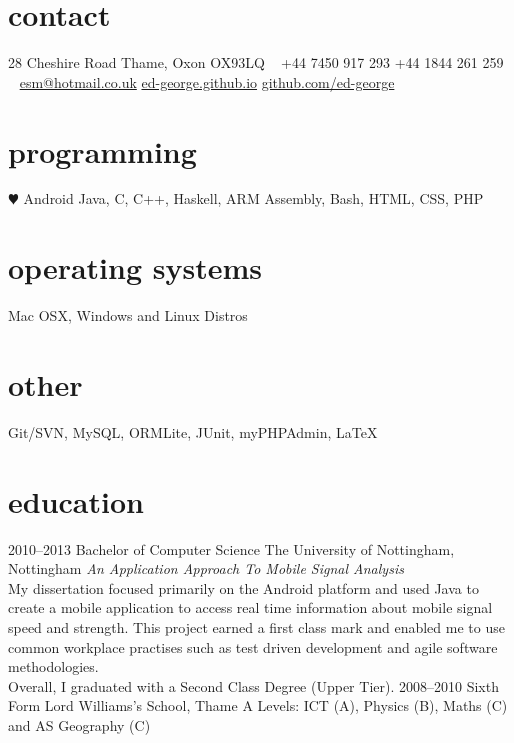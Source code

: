 \documentclass[]{friggeri-cv} %
\begin{document}


\begin{aside} %
\section{contact}
28 Cheshire Road
Thame, Oxon
OX93LQ
~
+44 7450 917 293
+44 1844 261 259
~
\href{mailto:esm@hotmail.co.uk}{esm@hotmail.co.uk}
\href{http://ed-george.github.io}{ed-george.github.io}
\href{http://github.com/ed-george}{github.com/ed-george}
\section{programming}
{\color{red} $\varheartsuit$} Android
Java, C, C++, Haskell, ARM Assembly, Bash, HTML, CSS, PHP
\section{operating systems}
Mac OSX, Windows and Linux Distros
\section{other}
Git/SVN, MySQL, ORMLite, JUnit, myPHPAdmin, \LaTeX
\end{aside}


\section{education}

\begin{entrylist}
\entry
{2010--2013}
{Bachelor {\normalfont of Computer Science}}
{The University of Nottingham, Nottingham}
{\emph{An Application Approach To Mobile Signal Analysis} \\ My dissertation focused primarily on the Android platform and used Java to create a mobile application to access real time information about mobile signal speed and strength. This project earned a first class mark and enabled me to use common workplace practises such as test driven development and agile software methodologies.\\Overall, I graduated with a Second Class Degree (Upper Tier).}
\entry
{2008--2010}
{Sixth Form}
{Lord Williams's School, Thame}
{A Levels: ICT (A), Physics (B), Maths (C) and AS Geography (C)}
\end{entrylist}
\end{document}
